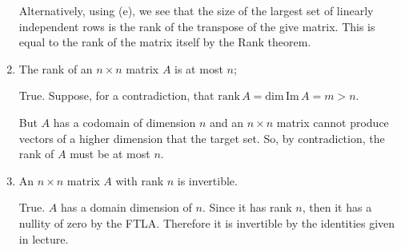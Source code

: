 \documentclass{article}
\begin{document}
\begin{enumerate}[label=(\alph*)]
    Alternatively, using (e), we see that the size of the largest set of linearly independent rows is the rank of the transpose of the give matrix. This is equal to the rank of the matrix itself by the Rank theorem.

  \item The rank of an $n\times n$ matrix $A$ is at most $n$;
    
  True. Suppose, for a contradiction, that $\text{rank}\,A=\text{dim}\,\text{Im}\,A=m>n$. 

  But $A$ has a codomain of dimension $n$ and an $n\times n$ matrix cannot produce vectors of a higher dimension that the target set. So, by contradiction, the rank of $A$ must be at most $n$.

  \item An $n\times n$ matrix $A$ with rank $n$ is invertible. 

    True. $A$ has a domain dimension of $n$. Since it has rank $n$, then it has a nullity of zero by the FTLA. Therefore it is invertible by the identities given in lecture.

\end{enumerate}
\end{document}
